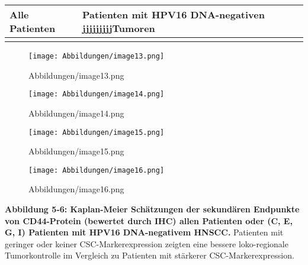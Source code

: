 \begin{tablenos:no-prefix-table-caption}

\begin{longtable}[]{@{}ll@{}}
\toprule()
Alle Patienten & Patienten mit HPV16 DNA-negativen jjjjjjjjjTumoren \\
\midrule()
\endhead
& \\
\bottomrule()
\end{longtable}

\end{tablenos:no-prefix-table-caption}

\begin{fignos:no-prefix-figure-caption}

\begin{figure}
\centering
\texttt{[image: Abbildungen/image13.png]}
\caption{Abbildungen/image13.png}
\end{figure}

\end{fignos:no-prefix-figure-caption}

\begin{fignos:no-prefix-figure-caption}

\begin{figure}
\centering
\texttt{[image: Abbildungen/image14.png]}
\caption{Abbildungen/image14.png}
\end{figure}

\end{fignos:no-prefix-figure-caption}

\begin{fignos:no-prefix-figure-caption}

\begin{figure}
\centering
\texttt{[image: Abbildungen/image15.png]}
\caption{Abbildungen/image15.png}
\end{figure}

\end{fignos:no-prefix-figure-caption}

\begin{fignos:no-prefix-figure-caption}

\begin{figure}
\centering
\texttt{[image: Abbildungen/image16.png]}
\caption{Abbildungen/image16.png}
\end{figure}

\end{fignos:no-prefix-figure-caption}

\textbf{Abbildung 5‑6: Kaplan-Meier Schätzungen der sekundären Endpunkte von CD44-Protein (bewertet durch IHC) allen Patienten oder (C, E, G, I) Patienten mit HPV16 DNA-negativem HNSCC.} Patienten mit geringer oder keiner CSC-Markerexpression zeigten eine bessere loko-regionale Tumorkontrolle im Vergleich zu Patienten mit stärkerer CSC-Markerexpression.

